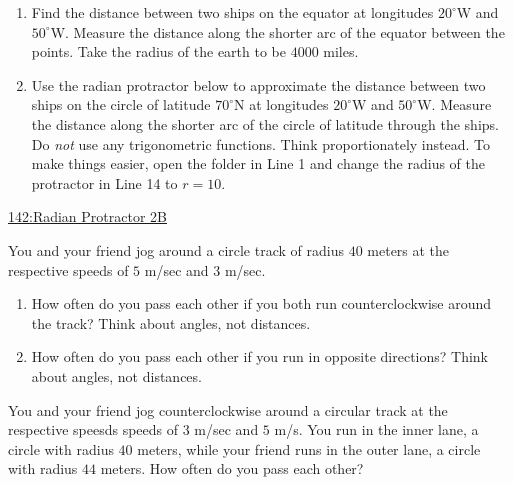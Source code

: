 \documentclass{ximera}
\begin{document}
\begin{question} \label{QPPPdfrr54g}

\begin{enumerate}
\item Find the distance between two ships on the equator at longitudes $20^\circ$W and $50^\circ$W. Measure the distance along the shorter arc of the equator between the points. Take the radius of the earth to be $4000$ miles.

\item Use the radian protractor below to approximate the distance between two ships on the circle of latitude $70^\circ$N at longitudes $20^\circ$W and $50^\circ$W. Measure the distance along the shorter arc of the circle of latitude through the ships. 
Do \emph{not} use any trigonometric functions. Think proportionately instead. To make things easier, open the folder in Line 1 and change the radius of the protractor in Line 14 to $r=10$.
\end{enumerate}

\begin{onlineOnly}
    \begin{center}
\end{center}

\href{https://www.desmos.com/calculator/vb1kvzkzlq}{142:Radian Protractor 2B}

\end{onlineOnly}
\end{question}




\begin{question}  \label{QPdfdft4tt4yg}
You and your friend jog around a circle track of radius $40$ meters at the respective speeds of $5$ m/sec and $3$ m/sec.

\begin{enumerate}

\item How often do you pass each other if you both run counterclockwise around the track? Think about angles, not distances.

\item How often do you pass each other if you run in opposite directions? Think about angles, not distances.


\end{enumerate}
\end{question}

\begin{question} \label{QOLfmdfrggfg}
You and your friend jog counterclockwise around a circular track at the respective speesds speeds of $3$ m/sec and $5$ m/s. You run in the inner lane, a circle with radius $40$ meters, while your friend runs in the outer lane, a circle with radius $44$ meters. How often do you pass each other?
\end{question}
\end{document}
